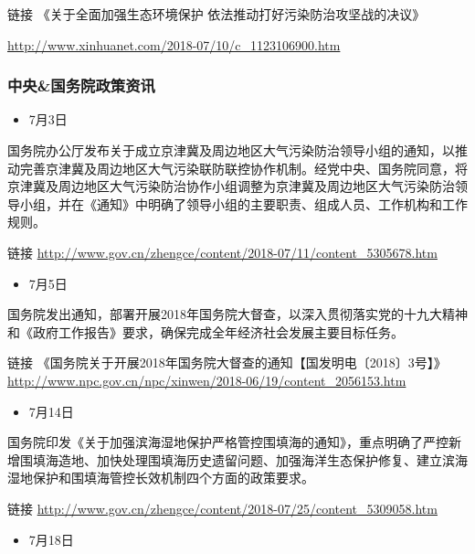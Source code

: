 \documentclass[
]{book}
\providecommand{\tightlist}{%
  \setlength{\itemsep}{0pt}\setlength{\parskip}{0pt}}
\begin{document}
链接 《关于全面加强生态环境保护 依法推动打好污染防治攻坚战的决议》

\url{http://www.xinhuanet.com/2018-07/10/c_1123106900.htm}

\hypertarget{ux4e2dux592eux56fdux52a1ux9662ux653fux7b56ux8d44ux8baf-3}{%
\subsubsection*{中央\&国务院政策资讯}\label{ux4e2dux592eux56fdux52a1ux9662ux653fux7b56ux8d44ux8baf-3}}

\begin{itemize}
\tightlist
\item
  7月3日
\end{itemize}

国务院办公厅发布关于成立京津冀及周边地区大气污染防治领导小组的通知，以推动完善京津冀及周边地区大气污染联防联控协作机制。经党中央、国务院同意，将京津冀及周边地区大气污染防治协作小组调整为京津冀及周边地区大气污染防治领导小组，并在《通知》中明确了领导小组的主要职责、组成人员、工作机构和工作规则。

链接 \url{http://www.gov.cn/zhengce/content/2018-07/11/content_5305678.htm}

\begin{itemize}
\tightlist
\item
  7月5日
\end{itemize}

国务院发出通知，部署开展2018年国务院大督查，以深入贯彻落实党的十九大精神和《政府工作报告》要求，确保完成全年经济社会发展主要目标任务。

链接 《国务院关于开展2018年国务院大督查的通知【国发明电〔2018〕3号】》\url{http://www.npc.gov.cn/npc/xinwen/2018-06/19/content_2056153.htm}

\begin{itemize}
\tightlist
\item
  7月14日
\end{itemize}

国务院印发《关于加强滨海湿地保护严格管控围填海的通知》，重点明确了严控新增围填海造地、加快处理围填海历史遗留问题、加强海洋生态保护修复、建立滨海湿地保护和围填海管控长效机制四个方面的政策要求。

链接 \url{http://www.gov.cn/zhengce/content/2018-07/25/content_5309058.htm}

\begin{itemize}
\tightlist
\item
  7月18日
\end{itemize}
\end{document}

